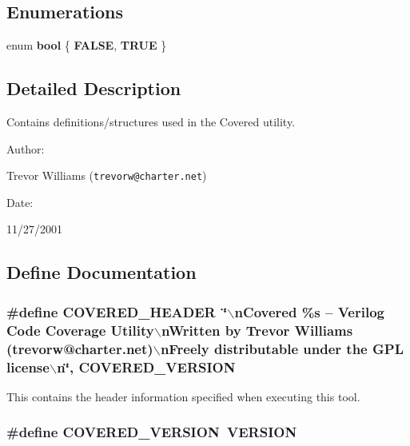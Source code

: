 \subsection*{Enumerations}
\begin{CompactItemize}
\item 
enum {\bf bool} \{ {\bf FALSE}, 
{\bf TRUE}
 \}
\end{CompactItemize}


\subsection{Detailed Description}
Contains definitions/structures used in the Covered utility.



\begin{Desc}
\item[Author: ]\par
Trevor Williams ({\tt trevorw@charter.net}) \end{Desc}
\begin{Desc}
\item[Date: ]\par
11/27/2001\end{Desc}


\subsection{Define Documentation}
\subsubsection{\setlength{\rightskip}{0pt plus 5cm}\#define COVERED\_\-HEADER\ \char`\"{}$\backslash$n\-Covered \%s -- Verilog Code Coverage Utility$\backslash$n\-Written by Trevor Williams  (trevorw@charter.net)$\backslash$n\-Freely distributable under the GPL license$\backslash$n\char`\"{}, COVERED\_\-VERSION}\label{defines_8h_a1}


This contains the header information specified when executing this tool. 
\subsubsection{\setlength{\rightskip}{0pt plus 5cm}\#define COVERED\_\-VERSION\ VERSION}\label{defines_8h_a0}


